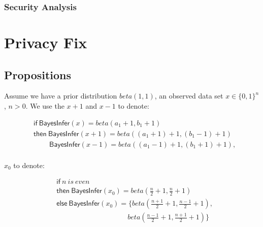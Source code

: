 \documentclass{article}
\begin{document}
\subsubsection{Security Analysis}


\section{Privacy Fix}

\subsection{Propositions}
Assume we have a prior distribution $beta(1,1)$, an observed data set $x \in \{0,1\}^n$, $n>0$. We use the $x+1$ and $x-1$ to denote:
\begin{small}
\begin{equation*}
\begin{split}
&\mathsf{if\ BayesInfer}(x) = beta(a_1 + 1,b_1 + 1)\\
&\mathsf{then}\mathsf{\ BayesInfer}(x + 1) = beta((a_1 + 1) +1, (b_1 - 1)+1)\\
&\quad \quad \mathsf{\ BayesInfer}(x - 1) = beta((a_1 - 1) +1, (b_1 + 1)+1),\\
\end{split}
\end{equation*}
\end{small}

$x_0$ to denote:
\begin{small}
\begin{equation*}
\begin{split}
&\mathsf{if}\ n\ is\ even\\
&\mathsf{then}\ \mathsf{BayesInfer}(x_0) = beta(\frac{n}{2} + 1, \frac{n}{2} + 1)\\
&\mathsf{else}\ \mathsf{BayesInfer}(x_0) = \{beta(\frac{n+1}{2} + 1, \frac{n-1}{2} + 1),\\
&\quad \quad \quad \quad \quad \quad \quad \quad \quad \quad beta(\frac{n - 1}{2} + 1, \frac{n + 1}{2} + 1)\}
\end{split}
\end{equation*}
\end{small}
\end{document}
